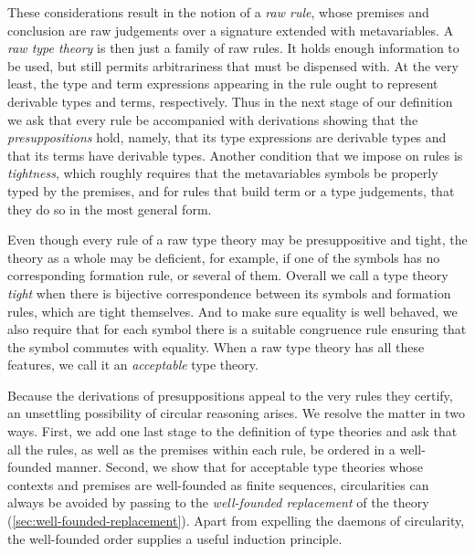 These considerations result in the notion of a \emph{raw rule}, whose premises and conclusion are raw judgements over a signature extended with metavariables. A \emph{raw type theory} is then just a family of raw rules. It holds enough information to be used, but still permits arbitrariness that must be dispensed with.
%
At the very least, the type and term expressions appearing in the rule ought to represent derivable types and terms, respectively.
%
Thus in the next stage of our definition we ask that every rule be accompanied with derivations showing that the \emph{presuppositions} hold, namely, that its type expressions are derivable types and that its terms have derivable types.
%
Another condition that we impose on rules is \emph{tightness}, which roughly requires that the metavariables symbols be properly typed by the premises, and for rules that build term or a type judgements, that they do so in the most general form.

Even though every rule of a raw type theory may be presuppositive and tight, the theory as a whole may be deficient, for example, if one of the symbols has no corresponding formation rule, or several of them. Overall we call a type theory \emph{tight} when there is bijective correspondence between its symbols and formation rules, which are tight themselves. And to make sure equality is well behaved, we also require that for each symbol there is a suitable congruence rule ensuring that the symbol commutes with equality. When a raw type theory has all these features, we call it an \emph{acceptable} type theory.

Because the derivations of presuppositions appeal to the very rules they certify, an unsettling possibility of circular reasoning arises.
%
We resolve the matter in two ways. 
%
First, we add one last stage to the definition of type theories and ask that all the rules, as well as the premises within each rule, be ordered in a well-founded manner.
%
Second, we show that for acceptable type theories whose contexts and premises are well-founded as finite sequences, circularities can always be avoided by passing to the \emph{well-founded replacement} of the theory (\cref{sec:well-founded-replacement}).
%
Apart from expelling the daemons of circularity, the well-founded order supplies a useful induction principle.

